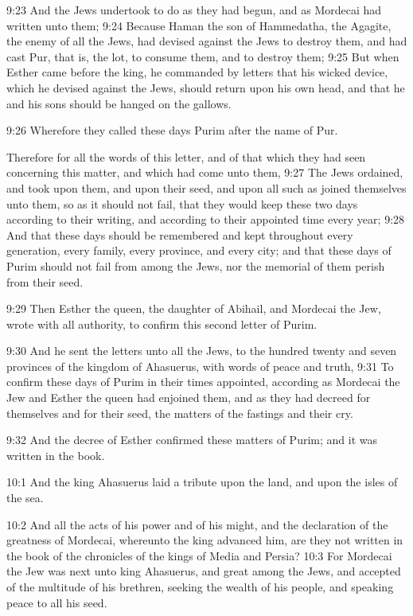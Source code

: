 9:23 And the Jews undertook to do as they had begun, and as Mordecai
had written unto them; 9:24 Because Haman the son of Hammedatha, the
Agagite, the enemy of all the Jews, had devised against the Jews to
destroy them, and had cast Pur, that is, the lot, to consume them, and
to destroy them; 9:25 But when Esther came before the king, he
commanded by letters that his wicked device, which he devised against
the Jews, should return upon his own head, and that he and his sons
should be hanged on the gallows.

9:26 Wherefore they called these days Purim after the name of Pur.

Therefore for all the words of this letter, and of that which they had
seen concerning this matter, and which had come unto them, 9:27 The
Jews ordained, and took upon them, and upon their seed, and upon all
such as joined themselves unto them, so as it should not fail, that
they would keep these two days according to their writing, and
according to their appointed time every year; 9:28 And that these days
should be remembered and kept throughout every generation, every
family, every province, and every city; and that these days of Purim
should not fail from among the Jews, nor the memorial of them perish
from their seed.

9:29 Then Esther the queen, the daughter of Abihail, and Mordecai the
Jew, wrote with all authority, to confirm this second letter of Purim.

9:30 And he sent the letters unto all the Jews, to the hundred twenty
and seven provinces of the kingdom of Ahasuerus, with words of peace
and truth, 9:31 To confirm these days of Purim in their times
appointed, according as Mordecai the Jew and Esther the queen had
enjoined them, and as they had decreed for themselves and for their
seed, the matters of the fastings and their cry.

9:32 And the decree of Esther confirmed these matters of Purim; and it
was written in the book.

10:1 And the king Ahasuerus laid a tribute upon the land, and upon the
isles of the sea.

10:2 And all the acts of his power and of his might, and the
declaration of the greatness of Mordecai, whereunto the king advanced
him, are they not written in the book of the chronicles of the kings
of Media and Persia?  10:3 For Mordecai the Jew was next unto king
Ahasuerus, and great among the Jews, and accepted of the multitude of
his brethren, seeking the wealth of his people, and speaking peace to
all his seed.

